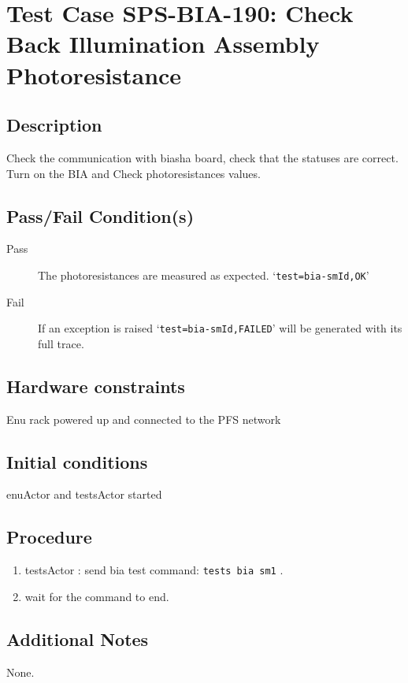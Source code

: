 \section{Test Case SPS-BIA-190: Check Back Illumination Assembly Photoresistance}

\subsection{Description}

Check the communication with biasha board, check that the statuses are correct.
Turn on the BIA and Check photoresistances values.

\subsection{Pass/Fail Condition(s)}

\begin{description}
\item [Pass] The photoresistances are measured as expected. `\texttt{test=bia-smId,OK}'
\item [Fail] If an exception is raised `\texttt{test=bia-smId,FAILED}' will be generated with its full trace.
\end{description}

\subsection{Hardware constraints}

Enu rack powered up and connected to the PFS network

\subsection{Initial conditions}
enuActor and testsActor started

\subsection{Procedure}

\begin{enumerate}
    \item testsActor : send bia test command: \texttt{tests bia sm1} .
    \item wait for the command to end.
\end{enumerate}



\subsection{Additional Notes}

None.